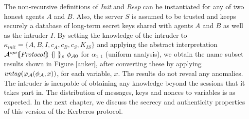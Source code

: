 \documentclass[10pt,a4paper,final,oneside,fleqn]{book}
\begin{document}
The non-recursive definitions of {\itshape Init\/} and {\itshape Resp\/} can be instantiated for any of two honest agents $A$ and $B$.  Also, the server $S$ is assumed to be trusted and keeps securely a database of long-term secret keys shared with agents $A$ and $B$ as well as the intruder $I$.  By setting the knowledge of the intruder to $\kappa_{init}=\{A,B,I,c_A,c_B,c_S,K_{IS}\}$ and applying the abstract interpretation $\mathcal{A}^{spi}(\![\mbox{{\itshape Protocol\/}}]\!)~\{\!|~|\!\}_\rho~\phi_{\mathcal{A}0}$ for $\alpha_{1,1}$ (uniform analysis), we obtain the name subset results shown in Figure \ref{anker}, after converting these by applying $\mbox{{\itshape untag\/}}(\varphi_\mathcal{A}(\phi_\mathcal{A},x))$, for each variable, $x$. The results do not reveal any anomalies. The intruder is incapable of obtaining any knowledge beyond the sessions that it takes part in.  The distribution of messages, keys and nonces to variables is as expected.  In the next chapter, we discuss the secrecy and authenticity properties of this version of the Kerberos protocol.
\end{document}

